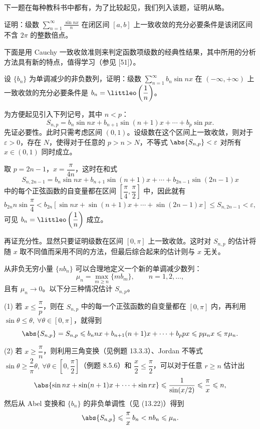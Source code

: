下一题在每种教科书中都有，为了比较起见，我们列入该题，证明从略。

\begin{xexample}[14.1.7]
证明：级数 $\displaystyle\sum_{n=1}^{\infty}\frac{\sin nx}{n}$ 在闭区间 $[a,b]$ 上一致收敛的充分必要条件是该闭区间不含 $2\pi$ 的整数倍点。
\end{xexample}

下面是用 Cauchy 一致收敛准则来判定函数项级数的经典性结果，其中所用的分析方法具有新的特点，值得学习（参见 [51]）。

\begin{xexample}[14.1.8]
设 $\{b_n\}$ 为单调减少的非负数列，证明：级数 $\displaystyle\sum_{n=1}^{\infty}b_n\sin nx$ 在 $(-\infty,+\infty)$ 上一致收敛的充分必要条件是 $b_n=\littleo\left(\dfrac1n\right)$。
\end{xexample}
\begin{xproof}
为方便起见引入下列记号，其中 $n<p$：
\[
  S_{n,p}=b_n\sin nx+b_{n+1}\sin(n+1)x+\cdots+b_p\sin px.
\]
先证必要性。此时只需考虑区间 $(0,1)$。设级数在这个区间上一致收敛，则对于 $\varepsilon>0$，存在 $N$，使得对于任意的 $p>n>N$，不等式 $\abs{S_{n,p}}<\varepsilon$ 对所有 $x\in(0,1)$ 同时成立。

取 $p=2n-1$，$x=\dfrac{\pi}{4n}$，这时在和式
\[
  S_{n,2n-1}=b_n\sin nx+b_{n+1}\sin(n+1)x+\cdots+b_{2n-1}\sin(2n-1)x
\]
中的每个正弦函数的自变量都在区间 $\left[\dfrac\pi4,\dfrac\pi2\right]$ 中，因此就有
\[
  b_{2n}n\sin\frac\pi4<b_{2n}[\sin nx+\sin(n+1)x+\cdots+\sin(2n-1)x]\leqslant S_{n,2n-1}<\varepsilon,
\]
可见 $b_n=\littleo\left(\dfrac1n\right)$ 成立。

再证充分性。显然只要证明级数在区间 $[0,\pi]$ 上一致收敛。这时对 $S_{n,p}$ 的估计将随 $x$ 取不同值而采用不同的方法，但最后综合起来的估计则与 $x$ 无关。

从非负无穷小量 $\{nb_n\}$ 可以合理地定义一个新的单调减少数列：
\[
  \mu_n=\max_{m\geqslant n}\{mb_m\},\qquad n=1,2,\ldots,
\]
且有 $\mu_n\to0$。以下分三种情况估计 $S_{n,p}$。

(1) 若 $x\leqslant\dfrac\pi p$，则在 $S_{n,p}$ 中的每一个正弦函数的自变量都在 $[0,\pi]$ 内，再利用 $\sin\theta\leqslant\theta,\ \forall\theta\in[0,\pi]$，就得到
\[
  \abs{S_{n,p}}=S_{n,p}\leqslant b_nnx+b_{n+1}(n+1)x+\cdots+b_ppx\leqslant p\mu_nx\leqslant\pi\mu_n.
\]

(2) 若 $x\geqslant\dfrac\pi n$，则利用三角变换（见例题 13.3.3）、Jordan 不等式 $\sin\theta\geqslant\dfrac2\pi\theta,\ \forall\theta\in[0,\dfrac\pi2]$（例题 8.5.6）和 $\dfrac x2\leqslant\dfrac\pi2$，可以对于任意 $r\geqslant n$ 估计出
\[
  \abs{\sin nx+\sin(n+1)x+\cdots+\sin rx}\leqslant\frac1{\sin(x/2)}\leqslant\frac\pi x\leqslant n,
\]
然后从 Abel 变换和 $\{b_n\}$ 的非负单调性（见 (13.22)）得到
\[
  \abs{S_{n,p}}\leqslant\frac\pi x\,b_n<nb_n\leqslant\mu_n.
\]


\end{xproof}
